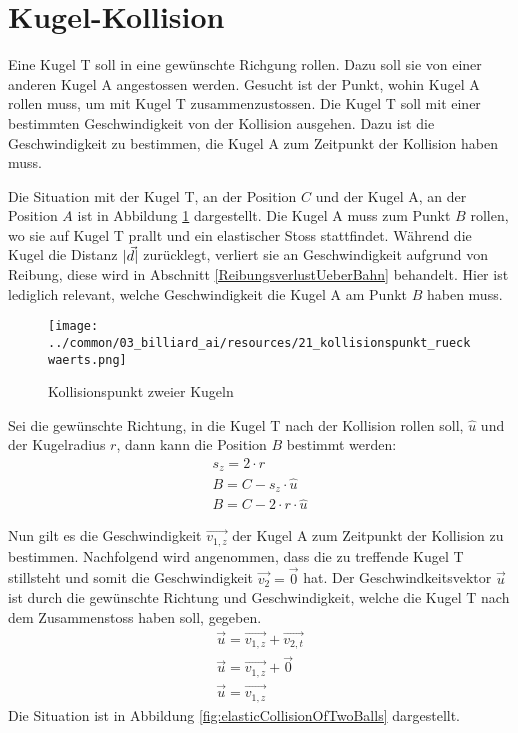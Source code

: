 \section{Kugel-Kollision}\label{anhang:herleitung:ballCollisionReverse}
Eine Kugel T soll in eine gewünschte Richgung rollen. Dazu soll sie von einer anderen Kugel A angestossen werden.
Gesucht ist der Punkt, wohin Kugel A rollen muss, um mit Kugel T zusammenzustossen.
Die Kugel T soll mit einer bestimmten Geschwindigkeit von der Kollision ausgehen.
Dazu ist die Geschwindigkeit zu bestimmen, die Kugel A  zum Zeitpunkt der Kollision haben muss.

Die Situation mit der Kugel T, an der Position $C$ und der Kugel A, an der Position $A$ ist in Abbildung \ref{fig:ballCollisionPointReverse}
dargestellt. Die Kugel A muss zum Punkt $B$ rollen, wo sie auf Kugel T prallt und ein elastischer Stoss\cite{wiki.elastischer_stoss_physik:1} stattfindet.
Während die Kugel die Distanz $\lvert \vec{d} \rvert$ zurücklegt, verliert sie an Geschwindigkeit aufgrund von Reibung,
diese wird in Abschnitt \ref{ReibungsverlustUeberBahn} behandelt. Hier ist lediglich relevant, welche Geschwindigkeit
die Kugel A am Punkt $B$ haben muss.

\begin{figure}[h!]
    \begin{center}
        \texttt{[image: ../common/03\_billiard\_ai/resources/21\_kollisionspunkt\_rueckwaerts.png]}
    \end{center}
    \caption{Kollisionspunkt zweier Kugeln}
    \label{fig:ballCollisionPointReverse}
\end{figure}

Sei die gewünschte Richtung, in die Kugel T nach der Kollision rollen soll, $\hat{u}$ und der Kugelradius $r$, dann kann die Position $B$ bestimmt werden:
\begin{align}
    s_z = 2 \cdot r\\
    B = C - s_z \cdot \hat{u}\\
    B = C - 2 \cdot r \cdot \hat{u}
\end{align}

Nun gilt es die Geschwindigkeit $\vec{v_{1,z}}$ der Kugel A zum Zeitpunkt der Kollision zu bestimmen.
Nachfolgend wird angenommen, dass die zu treffende Kugel T stillsteht und somit die Geschwindigkeit $\vec{v_2} = \vec{0}$ hat.
Der Geschwindkeitsvektor $\vec{u}$ ist durch die gewünschte Richtung und Geschwindigkeit,
welche die Kugel T nach dem Zusammenstoss haben soll, gegeben.
\begin{align}
    \vec{u} = \vec{v_{1,z}} + \vec{v_{2,t}}\\
    \vec{u} = \vec{v_{1,z}} + \vec{0}\\
    \vec{u} = \vec{v_{1,z}}
\end{align}
Die Situation ist in Abbildung \ref{fig:elasticCollisionOfTwoBalls} dargestellt.

